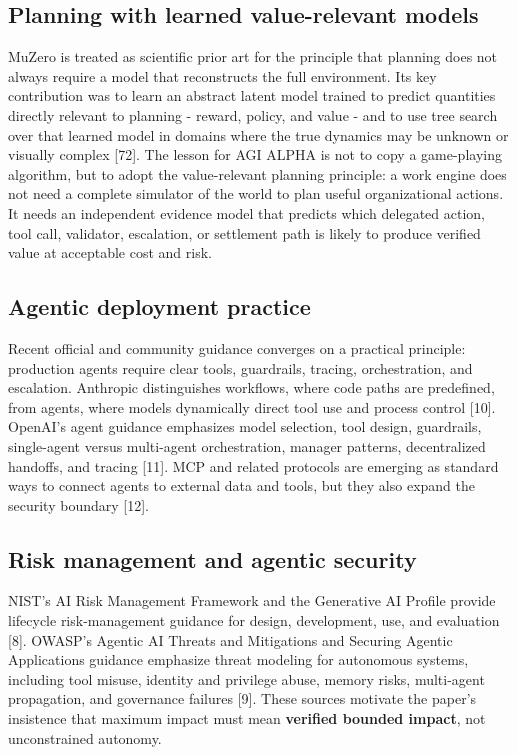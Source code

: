 \documentclass[
  11pt,
]{article}
\begin{document}
\subsection{Planning with learned value-relevant
models}\label{planning-with-learned-value-relevant-models}

MuZero is treated as scientific prior art for the principle that
planning does not always require a model that reconstructs the full
environment. Its key contribution was to learn an abstract latent model
trained to predict quantities directly relevant to planning - reward,
policy, and value - and to use tree search over that learned model in
domains where the true dynamics may be unknown or visually complex
{[}72{]}. The lesson for AGI ALPHA is not to copy a game-playing
algorithm, but to adopt the value-relevant planning principle: a work
engine does not need a complete simulator of the world to plan useful
organizational actions. It needs an independent evidence model that
predicts which delegated action, tool call, validator, escalation, or
settlement path is likely to produce verified value at acceptable cost
and risk.

\subsection{Agentic deployment
practice}\label{agentic-deployment-practice}

Recent official and community guidance converges on a practical
principle: production agents require clear tools, guardrails, tracing,
orchestration, and escalation. Anthropic distinguishes workflows, where
code paths are predefined, from agents, where models dynamically direct
tool use and process control {[}10{]}. OpenAI's agent guidance
emphasizes model selection, tool design, guardrails, single-agent versus
multi-agent orchestration, manager patterns, decentralized handoffs, and
tracing {[}11{]}. MCP and related protocols are emerging as standard
ways to connect agents to external data and tools, but they also expand
the security boundary {[}12{]}.

\subsection{Risk management and agentic
security}\label{risk-management-and-agentic-security}

NIST's AI Risk Management Framework and the Generative AI Profile
provide lifecycle risk-management guidance for design, development, use,
and evaluation {[}8{]}. OWASP's Agentic AI Threats and Mitigations and
Securing Agentic Applications guidance emphasize threat modeling for
autonomous systems, including tool misuse, identity and privilege abuse,
memory risks, multi-agent propagation, and governance failures {[}9{]}.
These sources motivate the paper's insistence that maximum impact must
mean \textbf{verified bounded impact}, not unconstrained autonomy.
\end{document}
